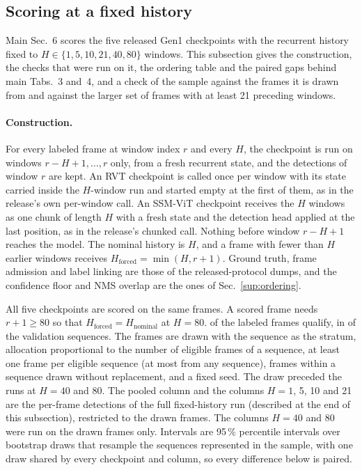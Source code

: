 \documentclass[10pt,twocolumn,letterpaper]{article}
\begin{document}
\subsection{Scoring at a fixed history}
\label{sup:fixedh}

Main Sec.~6 scores the five released Gen1 checkpoints with the recurrent history fixed to $H\in\{1,5,10,21,40,80\}$ windows. This subsection gives the construction, the checks that were run on it, the ordering table and the paired gaps behind main Tabs.~3 and~4, and a check of the sample against the frames it is drawn from and against the larger set of frames with at least 21 preceding windows.

\paragraph{Construction.}
For every labeled frame at window index $r$ and every $H$, the checkpoint is run on windows $r-H+1,\dots,r$ only, from a fresh recurrent state, and the detections of window $r$ are kept. An RVT checkpoint is called once per window with its state carried inside the $H$-window run and started empty at the first of them, as in the release's own per-window call. An SSM-ViT checkpoint receives the $H$ windows as one chunk of length $H$ with a fresh state and the detection head applied at the last position, as in the release's chunked call. Nothing before window $r-H+1$ reaches the model. The nominal history is $H$, and a frame with fewer than $H$ earlier windows receives $H_{\mathrm{forced}}=\min(H,r+1)$. Ground truth, frame admission and label linking are those of the released-protocol dumps, and the confidence floor and NMS overlap are the ones of Sec.~\ref{sup:ordering}.

All five checkpoints are scored on the same \lhNFrames{} frames. A scored frame needs $r+1\ge80$ so that $H_{\mathrm{forced}}=H_{\mathrm{nominal}}$ at $H=80$. \lhNElig{} of the \fhNAll{} labeled frames qualify, in \lhNEligSeq{} of the \lhNSeqAll{} validation sequences. The \lhNFrames{} frames are drawn with the sequence as the stratum, allocation proportional to the number of eligible frames of a sequence, at least one frame per eligible sequence (at most \lhMaxPerSeq{} from any sequence), frames within a sequence drawn without replacement, and a fixed seed. The draw preceded the runs at $H=40$ and 80. The pooled column and the columns $H=1$, 5, 10 and 21 are the per-frame detections of the full fixed-history run (described at the end of this subsection), restricted to the drawn frames. The columns $H=40$ and 80 were run on the drawn frames only. Intervals are 95\,\% percentile intervals over \lhB{} bootstrap draws that resample the \lhNSeq{} sequences represented in the sample, with one draw shared by every checkpoint and column, so every difference below is paired.
\end{document}
